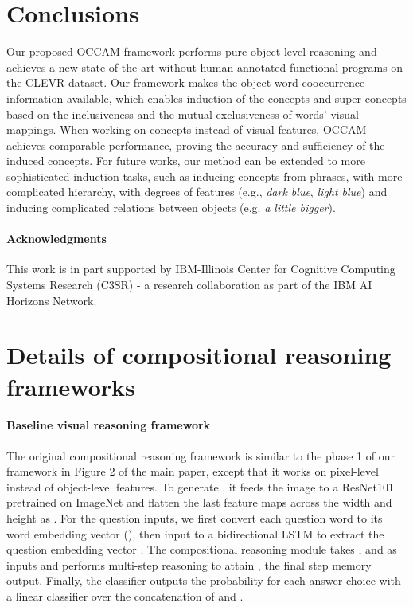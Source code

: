 \documentclass[10pt,twocolumn,letterpaper]{article}
\begin{document}
\section{Conclusions}
\vspace{-2mm}
Our proposed OCCAM framework performs pure object-level reasoning and achieves a new state-of-the-art without human-annotated functional programs on the CLEVR dataset.
Our framework makes the object-word cooccurrence information available, which enables induction of the concepts and super concepts based on the inclusiveness and the mutual exclusiveness of words' visual mappings.
When working on concepts instead of visual features, OCCAM achieves comparable performance, proving the accuracy and sufficiency of the induced concepts. 
For future works, our method can be extended to more sophisticated induction tasks, such as inducing concepts from phrases, with more complicated hierarchy, with degrees of features (e.g., \emph{dark blue}, \emph{light blue}) and inducing complicated relations between objects (e.g. \emph{a little bigger}).



\paragraph{Acknowledgments}
This work is in part supported by IBM-Illinois Center for Cognitive Computing Systems Research (C3SR) - a research collaboration as part of the IBM AI Horizons Network.

{\small


}




\clearpage
\appendix
\section{Details of compositional reasoning frameworks}
\label{app:reasoning_details}
\paragraph{Baseline visual reasoning framework} The original compositional reasoning framework \cite{hudson2018compositional} is similar to the phase 1 of our framework in Figure 2 of the main paper, except that it works on pixel-level instead of object-level features. To generate , it feeds the image to a ResNet101 \cite{He_2016_CVPR} pretrained on ImageNet \cite{deng2009imagenet} and flatten the last feature maps across the width and height as . For the question inputs, we first convert each question word to its word embedding vector (), then input  to a bidirectional LSTM \cite{hochreiter1997long,graves2005framewise} to extract the question embedding vector . The compositional reasoning module takes ,  and  as inputs and performs multi-step reasoning to attain , the final step memory output. Finally, the classifier outputs the probability for each answer choice with a linear classifier over the concatenation of  and . 
\vspace{-3mm}
\end{document}
